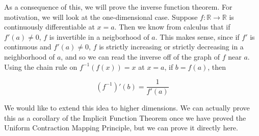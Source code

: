 \documentclass{article}
\def\R{{\mathbb R}}
\begin{document}
As a consequence of this, we will prove the inverse function theorem. For motivation, we will look at the one-dimensional case. Suppose $f: \R \rightarrow \R$ is continuously differentiable at $x = a$. Then we know from calculus that if $f'(a) \neq 0$, $f$ is invertible in a neigborhood of $a$. This makes sense, since if $f'$ is continuous and $f'(a) \neq 0$, $f$ is strictly increasing or strictly decreasing in a neighborhood of $a$, and so we can read the inverse off of the graph of $f$ near $a$. Using the chain rule on $f^{-1}(f(x)) = x$ at $x = a$, if $b = f(a)$, then

\[
(f^{-1})'(b) = \frac{1}{f'(a)}
\]

We would like to extend this idea to higher dimensions. We can actually prove this as a corollary of the Implicit Function Theorem once we have proved the Uniform Contraction Mapping Principle, but we can prove it directly here.\\

\end{document}
